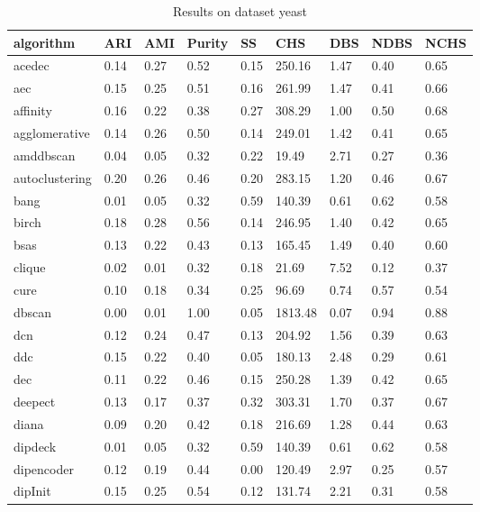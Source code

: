 \begin{table}[H]
\centering
\caption{Results on dataset yeast}
\label{S72_Table}
\begin{tabular}{|l|l|l|l|l|l|l|l|l|}
\hline
algorithm & ARI & AMI & Purity & SS & CHS & DBS & NDBS & NCHS \\
\hline
acedec & 0.14 & 0.27 & 0.52 & 0.15 & 250.16 & 1.47 & 0.40 & 0.65 \\
\hline
aec & 0.15 & 0.25 & 0.51 & 0.16 & 261.99 & 1.47 & 0.41 & 0.66 \\
\hline
affinity & 0.16 & 0.22 & 0.38 & 0.27 & 308.29 & 1.00 & 0.50 & 0.68 \\
\hline
agglomerative & 0.14 & 0.26 & 0.50 & 0.14 & 249.01 & 1.42 & 0.41 & 0.65 \\
\hline
amddbscan & 0.04 & 0.05 & 0.32 & 0.22 & 19.49 & 2.71 & 0.27 & 0.36 \\
\hline
autoclustering & 0.20 & 0.26 & 0.46 & 0.20 & 283.15 & 1.20 & 0.46 & 0.67 \\
\hline
bang & 0.01 & 0.05 & 0.32 & 0.59 & 140.39 & 0.61 & 0.62 & 0.58 \\
\hline
birch & 0.18 & 0.28 & 0.56 & 0.14 & 246.95 & 1.40 & 0.42 & 0.65 \\
\hline
bsas & 0.13 & 0.22 & 0.43 & 0.13 & 165.45 & 1.49 & 0.40 & 0.60 \\
\hline
clique & 0.02 & 0.01 & 0.32 & 0.18 & 21.69 & 7.52 & 0.12 & 0.37 \\
\hline
cure & 0.10 & 0.18 & 0.34 & 0.25 & 96.69 & 0.74 & 0.57 & 0.54 \\
\hline
dbscan & 0.00 & 0.01 & 1.00 & 0.05 & 1813.48 & 0.07 & 0.94 & 0.88 \\
\hline
dcn & 0.12 & 0.24 & 0.47 & 0.13 & 204.92 & 1.56 & 0.39 & 0.63 \\
\hline
ddc & 0.15 & 0.22 & 0.40 & 0.05 & 180.13 & 2.48 & 0.29 & 0.61 \\
\hline
dec & 0.11 & 0.22 & 0.46 & 0.15 & 250.28 & 1.39 & 0.42 & 0.65 \\
\hline
deepect & 0.13 & 0.17 & 0.37 & 0.32 & 303.31 & 1.70 & 0.37 & 0.67 \\
\hline
diana & 0.09 & 0.20 & 0.42 & 0.18 & 216.69 & 1.28 & 0.44 & 0.63 \\
\hline
dipdeck & 0.01 & 0.05 & 0.32 & 0.59 & 140.39 & 0.61 & 0.62 & 0.58 \\
\hline
dipencoder & 0.12 & 0.19 & 0.44 & 0.00 & 120.49 & 2.97 & 0.25 & 0.57 \\
\hline
dipInit & 0.15 & 0.25 & 0.54 & 0.12 & 131.74 & 2.21 & 0.31 & 0.58 \\

\end{tabular}
\end{table}
